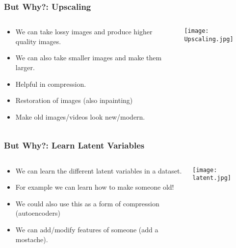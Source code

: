 \begin{frame}
    \frametitle{But Why?: Upscaling}
    \begin{columns}
        \begin{column}{0.48\paperwidth}
            \begin{itemize}
                \item We can take lossy images and produce higher quality
                    images.
                \item We can also take smaller images and make them larger.
                \item Helpful in compression.
                \item Restoration of images (also inpainting)
                \item Make old images/videos look new/modern.
            \end{itemize}
        \end{column}
        \begin{column}{0.48\paperwidth}
            \texttt{[image: Upscaling.jpg]}
        \end{column}
    \end{columns}
\end{frame}

\begin{frame}
    \frametitle{But Why?: Learn Latent Variables}
    \begin{columns}
        \begin{column}{0.48\paperwidth}
            \begin{itemize}
                \item We can learn the different latent variables in a dataset.
                \item For example we can learn how to make someone old!
                \item We could also use this as a form of compression
                    (autoencoders)
                \item We can add/modify features of someone (add a mostache).
            \end{itemize}
        \end{column}
        \begin{column}{0.48\paperwidth}
            \texttt{[image: latent.jpg]}
        \end{column}
    \end{columns}
\end{frame}

